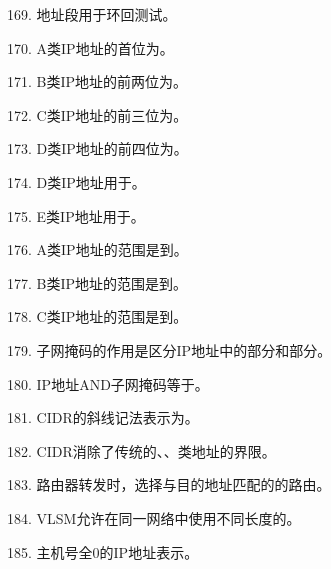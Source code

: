 169. \underline{\hspace{2cm}}地址段用于环回测试。

170. A类IP地址的首位为\underline{\hspace{2cm}}。

171. B类IP地址的前两位为\underline{\hspace{2cm}}。

172. C类IP地址的前三位为\underline{\hspace{2cm}}。

173. D类IP地址的前四位为\underline{\hspace{2cm}}。

174. D类IP地址用于\underline{\hspace{2cm}}。

175. E类IP地址用于\underline{\hspace{2cm}}。

176. A类IP地址的范围是\underline{\hspace{2cm}}到\underline{\hspace{2cm}}。

177. B类IP地址的范围是\underline{\hspace{2cm}}到\underline{\hspace{2cm}}。

178. C类IP地址的范围是\underline{\hspace{2cm}}到\underline{\hspace{2cm}}。

179. 子网掩码的作用是区分IP地址中的\underline{\hspace{2cm}}部分和\underline{\hspace{2cm}}部分。

180. IP地址AND子网掩码等于\underline{\hspace{2cm}}。

181. CIDR的斜线记法表示为\underline{\hspace{2cm}}。

182. CIDR消除了传统的\underline{\hspace{2cm}}、\underline{\hspace{2cm}}、\underline{\hspace{2cm}}类地址的界限。

183. 路由器转发时，选择与目的地址匹配的\underline{\hspace{2cm}}的路由。

184. VLSM允许在同一网络中使用不同长度的\underline{\hspace{2cm}}。

185. 主机号全0的IP地址表示\underline{\hspace{2cm}}。

